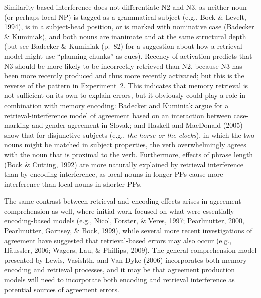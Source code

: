 \documentclass[12pt,titlepage]{article}
\newcommand{\itt}{\textit}  %
\newcommand{\IGNORE}[1]{} %
\begin{document}
{Similarity-based interference does not differentiate N2 and N3, as neither
noun (or perhaps local NP) is tagged as a grammatical subject (e.g., Bock
\& Levelt, 1994), is in a subject-head position, or is marked with
nominative case (Badecker \& Kuminiak), and both nouns are inanimate and at
the same structural depth (but see Badecker \& Kuminiak (p.~82) for a
suggestion about how a retrieval model might use ``planning chunks'' as
cues).  Recency of activation predicts that N3 should be more likely to be
incorrectly retrieved than N2, because N3 has been more recently produced
and thus more recently activated; but this is the reverse of the pattern in
Experiment~2.  This indicates that memory retrieval is not sufficient on
its own to explain errors, but it obviously could play a role in
combination with memory encoding:  Badecker and Kuminiak argue for a
retrieval-interference model of agreement based on an interaction between
case-marking and gender agreement in Slovak; and Haskell and MacDonald
(2005) show that for disjunctive subjects (e.g., \itt{the horse or the
clocks}), in which the two nouns might be matched in subject properties,
the verb overwhelmingly agrees with the noun that is proximal to the
verb.\IGNORE{ This effect may be explained by the possibility that both
nouns in a disjunction receive a subject flag, and with all else being
equal, the noun closest to the verb provides the retreival cue for the verb
as it was the most recently encounted and most active noun with the correct
grammatical properties triggering agreement.} Furthermore, effects of
phrase length (Bock \& Cutting, 1992) are more naturally explained by
retrieval interference than by encoding interference, as local nouns in
longer PPs cause more interference than local nouns in shorter PPs.

}

The same contrast between retrieval and encoding effects arises in
agreement comprehension as well, where initial work focused on what were
essentially encoding-based models (e.g., Nicol, Forster, \& Veres, 1997;
Pearlmutter, 2000, Pearlmutter, Garnsey, \& Bock, 1999), while several more
recent investigations of agreement have suggested that retrieval-based
errors may also occur (e.g., H\"{a}ussler, 2006; Wagers, Lau, \& Phillips,
2009).  The general comprehension model presented by Lewis, Vasishth, and
Van Dyke (2006) incorporates both memory encoding and retrieval processes,
and it may be that agreement production models will need to incorporate
both encoding and retrieval interference as potential sources of agreement
errors.
\end{document}
